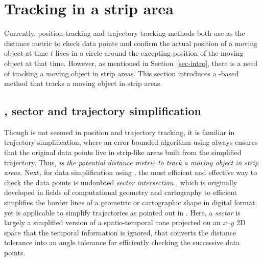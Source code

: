 

\section{Tracking in a strip area}
\label{sec:strip}


Currently, position tracking and trajectory tracking methods both use \sed as the distance metric to check data points and confirm the actual position of a moving object at time $t$ lives in a circle around the excepting position of the moving object at that time.
However, as mentioned in Section~\ref{sec-intro}, there is a need of tracking a moving object in strip areas.
This section introduces a \ped-based method that tracks a moving object in strip areas.


  

\subsection{\ped, sector and trajectory simplification}
\label{sec:sector-in-simp}

Though \ped is not seemed in position and trajectory tracking, it is familiar in trajectory simplification, where an error-bounded algorithm using \ped always ensures that the original data points live in strip-like areas built from the simplified trajectory. 
Thus, \textit{\ped is the potential distance metric to track a moving object in strip areas.}
%
Next, for data simplification using \ped, the most efficient and effective way to check the data points is undoubted \textit{sector intersection} \cite{Williams:Longest, Sklansky:Cone, Dunham:Cone, Zhao:Sleeve}, which is originally developed in fields of computational geometry and cartography to efficient simplifies the border lines of a geometric or cartographic shape in digital format, yet is applicable to simplify trajectories as pointed out in \cite{Lin:Cised}. Here, a \emph{sector} is largely a simplified version of a spatio-temporal cone projected on an $x$--$y$ 2D space that the temporal information is ignored, that converts the \ped distance tolerance into an angle tolerance for efficiently checking the successive data points.

